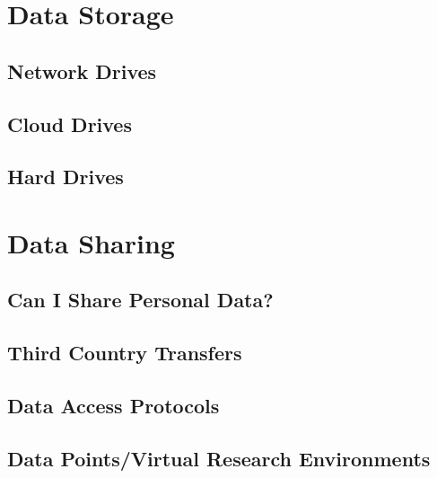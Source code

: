 \documentclass[
]{book}
\begin{document}
\hypertarget{data-storage}{%
\chapter{Data Storage}\label{data-storage}}

\hypertarget{network-drives}{%
\section{Network Drives}\label{network-drives}}

\hypertarget{cloud-drives}{%
\section{Cloud Drives}\label{cloud-drives}}

\hypertarget{hard-drives}{%
\section{Hard Drives}\label{hard-drives}}

\hypertarget{data-sharing}{%
\chapter{Data Sharing}\label{data-sharing}}

\hypertarget{can-i-share-personal-data}{%
\section{Can I Share Personal Data?}\label{can-i-share-personal-data}}

\hypertarget{third-country-transfers}{%
\section{Third Country Transfers}\label{third-country-transfers}}

\hypertarget{data-access-protocols}{%
\section{Data Access Protocols}\label{data-access-protocols}}

\hypertarget{data-pointsvirtual-research-environments}{%
\section{Data Points/Virtual Research Environments}\label{data-pointsvirtual-research-environments}}
\end{document}
